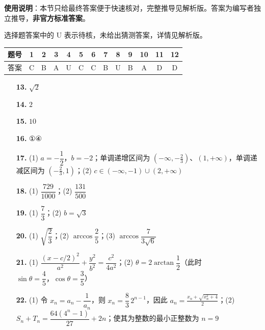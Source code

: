 
\begin{gknotice}
\textbf{使用说明}：本节只给最终答案便于快速核对，完整推导见解析版。答案为编写者独立推导，\textbf{非官方标准答案}。
\end{gknotice}

\begin{gknotice}
选择题答案中的 U 表示待核，未给出猜测答案，详情见解析版。
\end{gknotice}

\begin{center}\begin{tabular}{ccccccccccccc}
\toprule
题号 & 1 & 2 & 3 & 4 & 5 & 6 & 7 & 8 & 9 & 10 & 11 & 12 \\
\midrule
答案 & C & B & A & U & C & C & B & U & B & A & D & D \\
\bottomrule
\end{tabular}\end{center}

\begin{itemize}[leftmargin=2.6em]
  \item[\textbf{13.}] $\sqrt2$
  \item[\textbf{14.}] $2$
  \item[\textbf{15.}] $10$
  \item[\textbf{16.}] ①④
\end{itemize}

\begin{itemize}[leftmargin=2.6em]
  \item[\textbf{17.}] (1) $a=-\dfrac12\text{，}b=-2$；单调递增区间为 $(-\infty,-\frac23)$、$(1,+\infty)$，单调递减区间为 $(-\frac23,1)$；(2) $c\in(-\infty,-1)\cup(2,+\infty)$
  \item[\textbf{18.}] (1) $\dfrac{729}{1000}$；(2) $\dfrac{131}{500}$
  \item[\textbf{19.}] (1) $\dfrac73$；(2) $b=\sqrt3$
  \item[\textbf{20.}] (1) $\sqrt{\dfrac23}$；(2) $\arccos\dfrac25$；(3) $\arccos\dfrac7{3\sqrt6}$
  \item[\textbf{21.}] (1) $\dfrac{(x-c/2)^2}{a^2}+\dfrac{y^2}{b^2}=\dfrac{c^2}{4a^2}$；(2) $\theta=2\arctan\dfrac12$（此时 $\sin\theta=\dfrac45\text{，}\cos\theta=\dfrac35$）
  \item[\textbf{22.}] (1) 令 $x_n=a_n-\dfrac1{a_n}$，则 $x_n=\dfrac83\,2^{n-1}$，因此 $a_n=\frac{x_n+\sqrt{x_n^2+4}}2$；(2) $S_n+T_n=\dfrac{64(4^n-1)}{27}+2n$；使其为整数的最小正整数为 $n=9$
\end{itemize}
